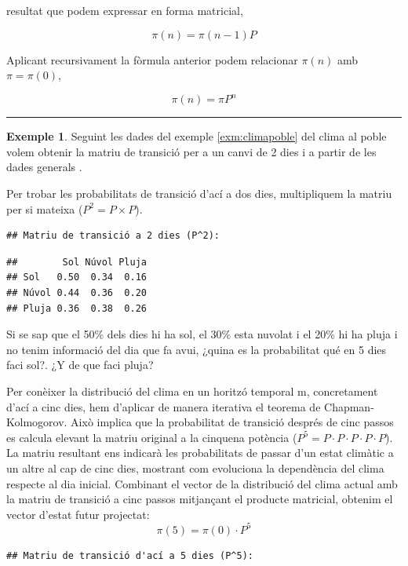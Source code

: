 \documentclass[
  catalan,
]{article}
\theoremstyle{definition}
\theoremstyle{definition}
\newtheorem{example}{Exemple}[section]
\theoremstyle{definition}
\theoremstyle{definition}
\theoremstyle{remark}
\begin{document}
resultat que podem expressar en forma matricial,

\[
\pi(n) = \pi(n-1)P 
\]

Aplicant recursivament la fòrmula anterior podem relacionar \(\pi(n)\) amb \(\pi = \pi(0)\),

\[
\pi(n) = \pi P^n
\]

\begin{center}\rule{0.5\linewidth}{0.5pt}\end{center}

\begin{example}

Seguint les dades del exemple \ref{exm:climapoble} del clima al poble volem obtenir la matriu de transició per a un canvi de 2 dies i a partir de les dades generals .

Per trobar les probabilitats de transició d'ací a dos dies, multipliquem la matriu per si mateixa (\(P^2 = P \times P\)).

\begin{verbatim}
## Matriu de transició a 2 dies (P^2):
\end{verbatim}

\begin{verbatim}
##        Sol Núvol Pluja
## Sol   0.50  0.34  0.16
## Núvol 0.44  0.36  0.20
## Pluja 0.36  0.38  0.26
\end{verbatim}

Si se sap que el 50\% dels dies hi ha sol, el 30\% esta nuvolat i el 20\% hi ha pluja i no tenim informació del dia que fa avui, ¿quina es la probabilitat qué en 5 dies faci sol?. ¿Y de que faci pluja?

Per conèixer la distribució del clima en un horitzó temporal m, concretament d'ací a cinc dies, hem d'aplicar de manera iterativa el teorema de Chapman-Kolmogorov. Això implica que la probabilitat de transició després de cinc passos es calcula elevant la matriu original a la cinquena potència (\(P^5 = P \cdot P \cdot P \cdot P \cdot P\)).
La matriu resultant ens indicarà les probabilitats de passar d'un estat climàtic a un altre al cap de cinc dies, mostrant com evoluciona la dependència del clima respecte al dia inicial.
Combinant el vector de la distribució del clima actual amb la matriu de transició a cinc passos mitjançant el producte matricial, obtenim el vector d'estat futur projectat:
\[\pi(5) = \pi(0) \cdot P^5\]

\begin{verbatim}
## Matriu de transició d'ací a 5 dies (P^5):
\end{verbatim}


\end{example}
\end{document}
